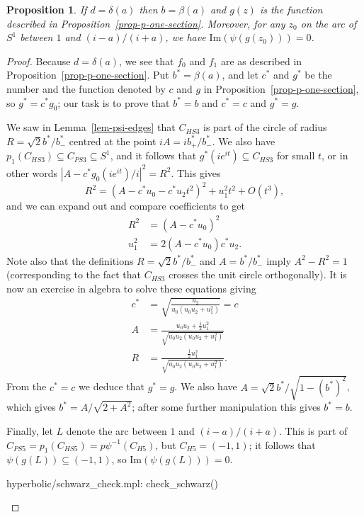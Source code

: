 \documentclass[reqno]{amsart}
\newcommand{\bt}        {\beta}
\newcommand{\dl}        {\delta}
\newcommand{\sse}       {\subseteq}
\newcommand{\half}      {\tfrac{1}{2}}
\newcommand{\rt}        {\sqrt{2}}
\renewcommand{\:}{\colon}
\newtheorem{proposition}[theorem]{Proposition}
\theoremstyle{definition}
\begin{document}
\begin{proposition}
 If $d=\dl(a)$ then $b=\bt(a)$ and $g(z)$ is the function described in
 Proposition~\ref{prop-p-one-section}.  Moreover, for any $z_0$ on the
 arc of $S^1$ between $1$ and $(i-a)/(i+a)$, we have
 $\text{Im}(\psi(g(z_0)))=0$.
\end{proposition}
\begin{proof}
 Because $d=\dl(a)$, we see that $f_0$ and $f_1$ are as described in
 Proposition~\ref{prop-p-one-section}.  Put $b^*=\bt(a)$, and let
 $c^*$ and $g^*$ be the number and the function denoted by $c$ and $g$
 in Proposition~\ref{prop-p-one-section}, so $g^*=c^*g_0$; our
 task is to prove that $b^*=b$ and $c^*=c$ and $g^*=g$.

 We saw in Lemma~\ref{lem-psi-edges} that $C_{HS3}$ is part
 of the circle of radius $R=\rt b^*/b^*_-$ centred at the point
 $iA=ib^*_+/b^*_-$.  We also have
 $p_1(C_{HS3})\sse C_{PS3}\sse S^1$, and it follows that
 $g^*(ie^{it})\sse C_{HS3}$ for small $t$, or in other words
 $|A-c^*g_0(ie^{it})/i|^2=R^2$.  This gives
 \[ R^2 = (A-c^*u_0-c^*u_2t^2)^2 + u_1^2t^2 + O(t^3), \]
 and we can expand out and compare coefficients to get
 \begin{align*}
  R^2 &= (A-c^*u_0)^2 \\
  u_1^2 &= 2(A-c^*u_0)c^*u_2.
 \end{align*}
 Note also that the definitions $R=\rt b^*/b^*_-$ and $A=b^*/b^*_-$
 imply $A^2-R^2=1$ (corresponding to the fact that $C_{HS3}$ crosses
 the unit circle orthogonally).  It is now an exercise in algebra to
 solve these equations giving
 \begin{align*}
  c^* &=  \sqrt{\frac{u_2}{u_0(u_0u_2+u_1^2)}}
           = c \\
  A &= \frac{u_0u_2 + \half u_1^2}{\sqrt{u_0u_2(u_0u_2+u_1^2)}} \\
  R &= \frac{\half u_1^2}{\sqrt{u_0u_2(u_0u_2+u_1^2)}}.
 \end{align*}
 From the $c^*=c$ we deduce that $g^*=g$.  We also have
 $A=\rt b^*/\sqrt{1-(b^*)^2}$, which gives $b^*=A/\sqrt{2+A^2}$; after
 some further manipulation this gives $b^*=b$.

 Finally, let $L$ denote the arc between $1$ and $(i-a)/(i+a)$.  This
 is part of $C_{PS5}=p_1(C_{HS5})=p\psi^{-1}(C_{H5})$, but
 $C_{H5}=(-1,1)$; it follows that $\psi(g(L))\sse (-1,1)$, so
 $\text{Im}(\psi(g(L)))=0$.
 \begin{checks}
  hyperbolic/schwarz_check.mpl: check_schwarz()
 \end{checks}
\end{proof}
\end{document}
